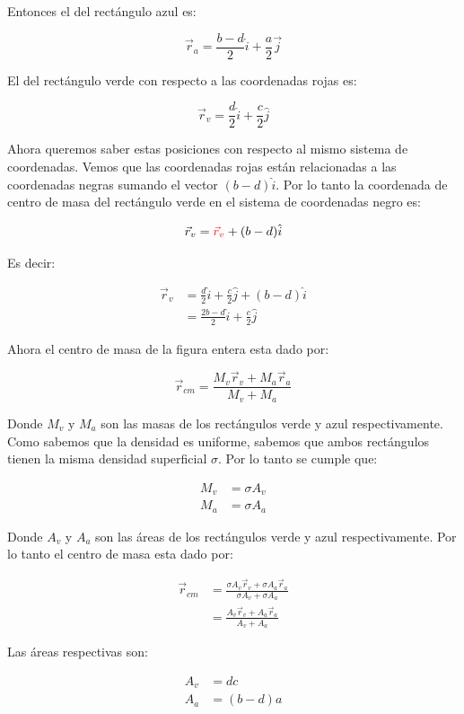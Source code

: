 \documentclass[a4paper,11pt]{article}
\begin{document}
Entonces el del rectángulo azul es:

$$ \vec{r}_a = \frac{b-d}{2} \hat{i} + \frac{a}{2} \vec{j}  $$

El del rectángulo verde con respecto a las coordenadas rojas es:

\color{red}

$$ \vec{r}_v = \frac{d}{2} \hat{i} + \frac{c}{2}\hat{j}$$

\color{black}
Ahora queremos saber estas posiciones con respecto al mismo sistema de coordenadas. Vemos que las coordenadas rojas están relacionadas a las coordenadas negras sumando el vector $(b-d) \hat{i}$. Por lo tanto la coordenada de centro de masa del rectángulo verde en el sistema de coordenadas negro es:

$$ \vec{r}_v = \color{red} \vec{r}_v \color{black}+ (b-d)\hat{i}$$

Es decir:

\begin{align*}
 \vec{r}_v &= \frac{d}{2} \hat{i} + \frac{c}{2}\hat{j} +  (b-d)\hat{i}\\
 &=  \frac{2b-d}{2}\hat{i} + \frac{c}{2}\hat{j} 
\end{align*}


Ahora el centro de masa de la figura entera esta dado por:

$$ \vec{r}_{cm} = \frac{ M_v \vec{r}_v+ M_a \vec{r}_a}{M_v + M_a}$$

Donde $M_v$ y $M_a$ son las masas de los rectángulos verde y azul respectivamente. Como sabemos que la densidad es uniforme, sabemos que ambos rectángulos tienen la misma densidad superficial $\sigma$. Por lo tanto se cumple que:

\begin{align*}
M_v &= \sigma A_v\\
M_a &= \sigma A_a
\end{align*}

Donde $A_v$ y $A_a$ son las áreas de los rectángulos verde y azul respectivamente. Por lo tanto el centro de masa esta dado por:


\begin{align*}
 \vec{r}_{cm} &= \frac{ \sigma A_v \vec{r}_v+ \sigma A_a \vec{r}_a}{\sigma A_v + \sigma A_a} \\
 & = \frac{  A_v \vec{r}_v+  A_a \vec{r}_a}{ A_v +  A_a}
\end{align*}


Las áreas respectivas son:

\begin{align*}
A_v & = dc\\
A_a & = (b-d)a
\end{align*}
\end{document}
